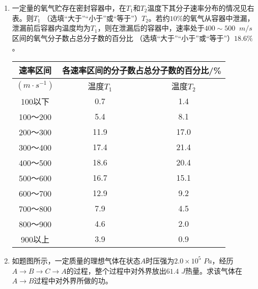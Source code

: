 \begin{enumerate}[leftmargin=0em]
\begin{enumerate}
\item 
一定量的氧气贮存在密封容器中，在$ T_{1} $和$ T_{2} $温度下其分子速率分布的情况见右表。则$ T_{1} $ （选填“大于”“小于”或“等于”）$ T_{2} $。若约$ 10 \% $的氧气从容器中泄漏，泄漏前后容器内温度均为$ T_{1} $，则在泄漏后的容器中，速率处于$ 400 \sim 500 $ $ \ m/s $区间的氧气分子数占总分子数的百分比  （选填“大于”“小于”或“等于”）$ 18.6 \% $。
\begin{table}[h!]
\centering 
\begin{tabular}{|c|c|c|}
\hline 
速率区间 & \multicolumn{2}{c|}{各速率区间的分子数占总分子数的百分比/\%}
\\
\hline
$ (m \cdot s ^{-1}) $ & 温度$ T_1 $ & 温度$ T_2 $
\\
\hline
100以下 & 0.7 & 1.4
\\
\hline
100～200 & 5.4 & 8.1
\\
\hline
200～300 & 11.9 & 17.0
\\
\hline
300～400 & 17.4 & 21.4
\\
\hline
400～500 & 18.6 & 20.4
\\
\hline
500～600 & 16.7 & 15.1
\\
\hline
600～700 & 12.9 & 9.2
\\
\hline
700～800 & 7.9 & 4.5
\\
\hline
800～900 & 4.6 & 2.0
\\
\hline
900以上 & 3.9 & 0.9\\ 
\hline 
\end{tabular}
\end{table} 



\item 
如题图所示，一定质量的理想气体在状态$ A $时压强为$ 2.0 \times 10^5 $ $ Pa $，经历$ A \rightarrow B \rightarrow C \rightarrow A $的过程，整个过程中对外界放出$ 61.4 $ $ J $热量。求该气体在$ A \rightarrow B $过程中对外界所做的功。
\begin{figure}[h!]
\flushright

\end{figure}




\end{enumerate}




\end{enumerate}
